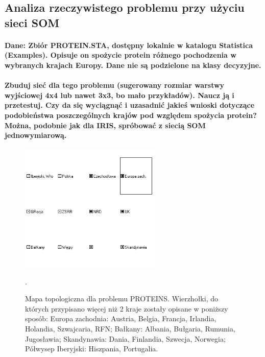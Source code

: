\begin{enumerate}
\end{enumerate}

\subsection{ Analiza rzeczywistego problemu przy użyciu sieci SOM}

 \paragraph{\textbf{Dane: Zbiór PROTEIN.STA, dostępny lokalnie w katalogu Statistica (Examples). Opisuje on spożycie protein różnego pochodzenia w wybranych krajach Europy. Dane nie są podzielone na klasy decyzyjne.}}
 \paragraph{\textbf{Zbuduj sieć dla tego problemu (sugerowany rozmiar warstwy wyjściowej 4x4 lub nawet 3x3, bo mało przykładów). Naucz ją i przetestuj. Czy da się wyciągnąć i uzasadnić jakieś wnioski dotyczące podobieństwa poszczególnych krajów pod względem spożycia protein? Można, podobnie jak dla IRIS, spróbować z siecią SOM jednowymiarową.}}

\begin{figure}[h]
\begin{centering}
\includegraphics[width=0.6\textwidth]{dane/part3/zad2/proteins12}
\caption{Mapa topologiczna dla problemu PROTEINS. Wierzhołki, do których przypisano więcej niż 2 kraje zostały opisane w poniższy sposób: Europa zachodnia: Austria, Belgia, Francja, Irlandia, Holandia, Szwajcaria, RFN; Bałkany: Albania, Bułgaria, Rumunia, Jugosławia; Skandynawia: Dania, Finlandia, Szwecja, Norwegia; Półwysep Iberyjski: Hiszpania, Portugalia.\label{fig:proteins12}}.
\end{centering}
\end{figure}

